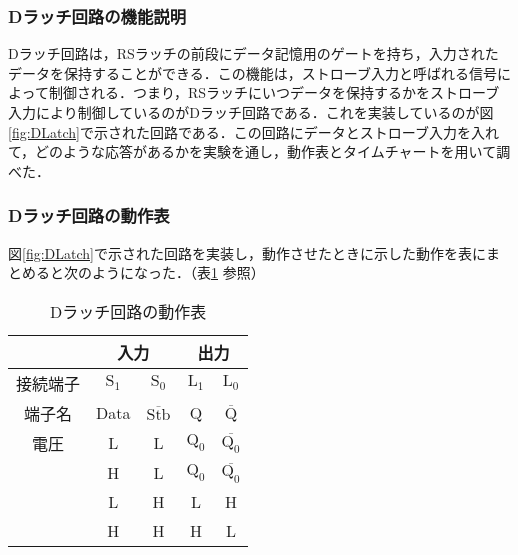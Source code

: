 %
%
\subsubsection{Dラッチ回路の機能説明}
\label{DLatch_explain}
Dラッチ回路は，RSラッチの前段にデータ記憶用のゲートを持ち，入力されたデータを保持することができる．この機能は，ストローブ入力と呼ばれる信号によって制御される．つまり，RSラッチにいつデータを保持するかをストローブ入力により制御しているのがDラッチ回路である．これを実装しているのが図\ref{fig:DLatch}で示された回路である．この回路にデータとストローブ入力を入れて，どのような応答があるかを実験を通し，動作表とタイムチャートを用いて調べた．

%
%
\subsubsection{Dラッチ回路の動作表}
\label{DLatch_dousahyou}
図\ref{fig:DLatch}で示された回路を実装し，動作させたときに示した動作を表にまとめると次のようになった．（表\ref{tab:DLatch_dousahyoutab} 参照）

\begin {table}[ht]
	\begin {center}
		\caption {Dラッチ回路の動作表}%
		\begin {tabular}{c|cc|cc}\hline
			\multicolumn{1}{c|}{}&%
			\multicolumn{2}{c}{入力}&%
			\multicolumn{2}{|c}{出力}\\ %
			\hline
			\multicolumn{1}{c|}{接続端子}&%
			\multicolumn{1}{c}{$\mathrm{S_1}$}&%
			\multicolumn{1}{c}{$\mathrm{S_0}$}&%
			\multicolumn{1}{|c}{$\mathrm{L_1}$}&%
			\multicolumn{1}{c}{$\mathrm{L_0}$}\\%
			\multicolumn{1}{c|}{端子名}&%
			\multicolumn{1}{c}{Data}&%
			\multicolumn{1}{c}{$\overline{\mathrm{Stb}}$}&%
			\multicolumn{1}{|c}{Q}&%
			\multicolumn{1}{c}{$\overline{\mathrm{Q}}$}\\%
			\hline
			電圧
			&L&L&$\mathrm{Q_0}$&$\overline{\mathrm{Q_0}}$\\%
			&H&L&$\mathrm{Q_0}$&$\overline{\mathrm{Q_0}}$\\%
			&L&H&L&H\\%
			&H&H&H&L\\
			\hline
		\end{tabular}
		\label {tab:DLatch_dousahyoutab}%
	\end{center}
\end{table}

